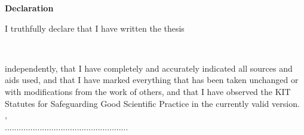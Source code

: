 

\begin{center}
{\LARGE {\textbf{Declaration}}}\\[2.5cm]
\end{center}
I truthfully declare that I have written the thesis
\vspace{1cm}
\begin{center}
\large {\titleofthesis}\\
\vspace{1cm}
\end{center}
independently, that I have completely and accurately indicated all sources and aids used, and that I have marked everything that has been taken unchanged or with modifications from the work of others, and that I have observed the KIT Statutes for Safeguarding Good Scientific Practice in the currently valid version.\\[2.5cm]
{\city}, {\dateofthesis}\\[0.75cm]
\hspace*{9.0cm}.....................................................\\
\hspace*{11.1cm}\name


